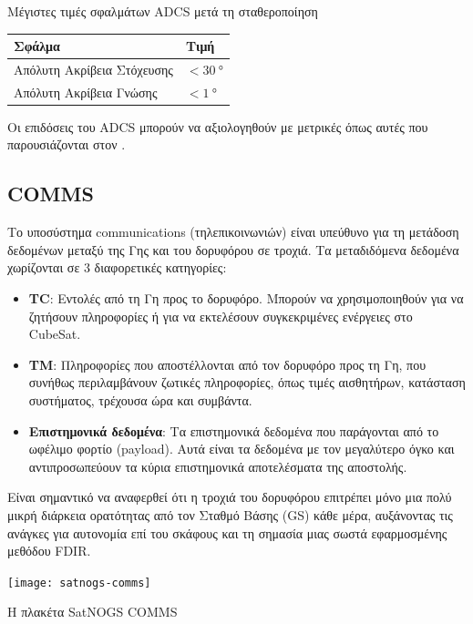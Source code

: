 \documentclass[a4paper,nobib]{tufte-book}
\begin{document}
\begin{margintable}
	\centering
	\caption[Μέγιστες τιμές σφαλμάτων ADCS μετά τη σταθεροποίηση]{Μέγιστες τιμές σφαλμάτων \ac{ADCS} μετά τη σταθεροποίηση}
	\label{tab:adcsape}
	\begin{tabular}{@{}ll@{}}
		\toprule
		Σφάλμα                      & Τιμή                    \\ \midrule
		Απόλυτη Ακρίβεια Στόχευσης & \( < \SI{30}{\degree} \) \\
		Απόλυτη Ακρίβεια Γνώσης    & \( < \SI{1}{\degree} \) 
	\end{tabular}
\end{margintable}

Οι επιδόσεις του \ac{ADCS} μπορούν να αξιολογηθούν με μετρικές όπως αυτές που παρουσιάζονται στον .

\subsection{\acf{COMMS}}

Το υποσύστημα communications (τηλεπικοινωνιών) είναι υπεύθυνο για τη μετάδοση δεδομένων μεταξύ της Γης και του δορυφόρου σε τροχιά. Τα μεταδιδόμενα δεδομένα χωρίζονται σε 3 διαφορετικές κατηγορίες\autocite{DDJF_TTC}:
\begin{itemize}
	\item \textbf{\acf{TC}}: Εντολές από τη Γη προς το δορυφόρο. Μπορούν να χρησιμοποιηθούν για να ζητήσουν πληροφορίες ή για να εκτελέσουν συγκεκριμένες ενέργειες στο CubeSat.
	\item \textbf{\acf{TM}}: Πληροφορίες που αποστέλλονται από τον δορυφόρο προς τη Γη, που συνήθως περιλαμβάνουν ζωτικές πληροφορίες, όπως τιμές αισθητήρων, κατάσταση συστήματος, τρέχουσα ώρα και συμβάντα.
	\item \textbf{Επιστημονικά δεδομένα}: Τα επιστημονικά δεδομένα που παράγονται από το ωφέλιμο φορτίο (payload). Αυτά είναι τα δεδομένα με τον μεγαλύτερο όγκο και αντιπροσωπεύουν τα κύρια επιστημονικά αποτελέσματα της αποστολής.
\end{itemize}

Είναι σημαντικό να αναφερθεί ότι η τροχιά του δορυφόρου επιτρέπει μόνο μια πολύ μικρή διάρκεια ορατότητας από τον Σταθμό Βάσης (\acf{GS}) κάθε μέρα, αυξάνοντας τις ανάγκες για αυτονομία επί του σκάφους και τη σημασία μιας σωστά εφαρμοσμένης μεθόδου \acs{FDIR}.

\begin{marginfigure}
	\texttt{[image: satnogs-comms]}
	\caption{Η πλακέτα SatNOGS COMMS}
\end{marginfigure}
\end{document}
